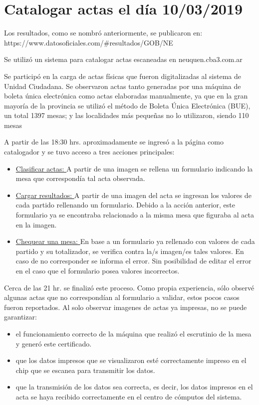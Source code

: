 \section{Catalogar actas el día 10/03/2019}
Los resultados, como se nombró anteriormente, se publicaron en: \newline https://www.datosoficiales.com/#resultados/GOB/NE 

 Se utilizó un sistema para catalogar actas escaneadas en neuquen.cba3.com.ar 
 
Se participó en la carga de actas físicas que fueron digitalizadas al sistema de Unidad Ciudadana. Se observaron actas tanto generadas por una máquina de boleta única electrónica como actas elaboradas manualmente, ya que en la gran mayoría de la provincia se utilizó el método de Boleta Única Electrónica (BUE), un total 1397 mesas; y las localidades más pequeñas no lo utilizaron, siendo 110 mesas \cite{eleccionesNeuquenBUE} 

A partir de las 18:30 hrs. aproximadamente se ingresó a la página como catalogador y se tuvo acceso a tres acciones principales: 

\begin{itemize}
    \item \underline{Clasificar actas: }A partir de una imagen se rellena un formulario indicando la mesa que correspondía tal acta observada.
    \item \underline{Cargar resultados: }A partir de una imagen del acta se ingresan los valores de cada partido rellenando un formulario. Debido a la acción anterior, este formulario ya se encontraba relacionado a la misma mesa que figuraba al acta en la imagen.
    \item \underline{Chequear una mesa: }En base a un formulario ya rellenado con valores de cada partido y su totalizador, se verifica contra la/s imagen/es tales valores. En caso de no corresponder se informa el error. Sin posibilidad de editar el error en el caso que el formulario posea valores incorrectos.
\end{itemize}

Cerca de las 21 hr. se finalizó este proceso. Como propia experiencia, sólo observé algunas actas que no correspondían al formulario a validar, estos pocos casos fueron reportados. 
Al solo observar imagenes de actas ya impresas, no se puede garantizar:
\begin{itemize}
    \item el funcionamiento correcto de la máquina que realizó el escrutinio de la mesa y generó este certificado.
    \item que los datos impresos que se visualizaron esté correctamente impreso en el chip que se escanea para transmitir los datos.
    \item que la transmisión de los datos sea correcta, es decir, los datos impresos  en el acta se haya recibido correctamente en el centro de cómputos del sistema.
\end{itemize}

